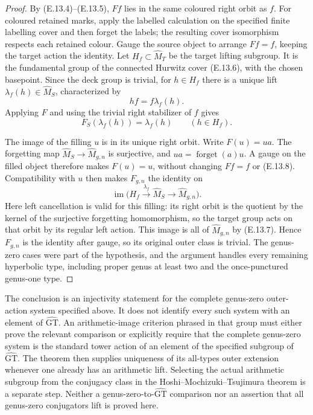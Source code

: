 \begin{proof}
By (E.13.4)--(E.13.5), $Ff$ lies in the same coloured right orbit
as $f$. For coloured retained marks, apply the labelled calculation
on the specified finite labelling cover and then forget the labels;
the resulting cover isomorphism respects each retained colour.
Gauge the source object to arrange $Ff=f$, keeping the
target action the identity. Let $H_f\subset\widehat M_T$ be the
target lifting subgroup. It is the fundamental group of the connected
Hurwitz cover (E.13.6), with the chosen basepoint. Since the deck
group is trivial, for $h\in H_f$ there is a unique lift
$\lambda_f(h)\in\widehat M_S$, characterized by
\[
                       h f=f\lambda_f(h).
\]
Applying $F$ and using the trivial right stabilizer of $f$ gives
\[
                     F_S(\lambda_f(h))=\lambda_f(h)
                     \qquad(h\in H_f).                       \tag{E.13.8}
\]

The image of the filling $u$ is in its unique right orbit. Write
$F(u)=u a$. The forgetting map
$\widehat M_S\to\widehat M_{g,n}$ is surjective, and
$u a=\operatorname{forget}(a)u$. A gauge on the filled object
therefore makes $F(u)=u$, without changing $Ff=f$ or (E.13.8).
Compatibility with $u$ then makes $F_{g,n}$ the identity on
\[
 \operatorname{im}\bigl(H_f\xrightarrow{\lambda_f}
                  \widehat M_S\longrightarrow\widehat M_{g,n}\bigr).
\]
Here left cancellation is valid for this filling: its right orbit is
the quotient by the kernel of the surjective forgetting homomorphism,
so the target group acts on that orbit by its regular left action.
This image is all of $\widehat M_{g,n}$ by (E.13.7). Hence
$F_{g,n}$ is the identity after gauge, so its original outer class is
trivial. The genus-zero cases were part of the hypothesis, and the
argument handles every remaining hyperbolic type, including proper
genus at least two and the once-punctured genus-one type.
\end{proof}

The conclusion is an injectivity statement for the complete genus-zero
outer-action system specified above. It does not identify every such
system with an element of $\widehat{\mathrm{GT}}$. An arithmetic-image
criterion phrased in that group must either prove the relevant comparison
or explicitly require that the complete genus-zero system is the standard
tower action of an element of the specified subgroup of
$\widehat{\mathrm{GT}}$. The theorem then supplies uniqueness of its
all-types outer extension whenever one already has an arithmetic lift.
Selecting the actual arithmetic subgroup from the conjugacy class in the
Hoshi--Mochizuki--Tsujimura theorem is a separate step. Neither a
genus-zero-to-$\widehat{\mathrm{GT}}$ comparison nor an assertion that
all genus-zero conjugators lift is proved here.
